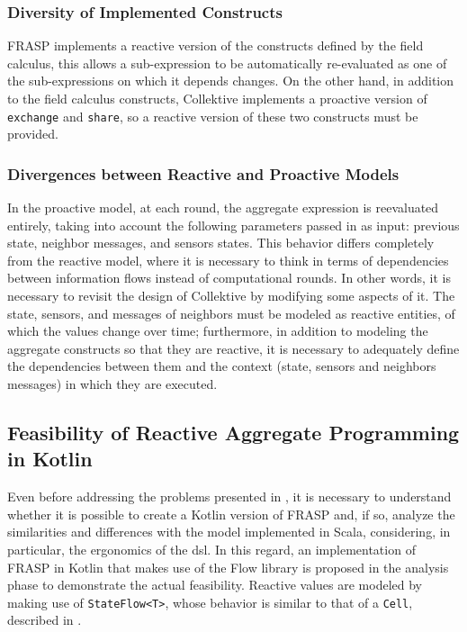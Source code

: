 \subsubsection{Diversity of Implemented Constructs}

FRASP implements a reactive version of the constructs defined by the field calculus, this allows a sub-expression to be automatically re-evaluated as one of the sub-expressions on which it depends changes. On the other hand, in addition to the field calculus constructs, Collektive implements a proactive version of \texttt{exchange} and \texttt{share}, so a reactive version of these two constructs must be provided.

\subsubsection{Divergences between Reactive and Proactive Models}

In the proactive model, at each round, the aggregate expression is reevaluated entirely, taking into account the following parameters passed in as input: previous state, neighbor messages, and sensors states. This behavior differs completely from the reactive model, where it is necessary to think in terms of dependencies between information flows instead of computational rounds. In other words, it is necessary to revisit the design of Collektive by modifying some aspects of it. The state, sensors, and messages of neighbors must be modeled as reactive entities, of which the values change over time; furthermore, in addition to modeling the aggregate constructs so that they are reactive, it is necessary to adequately define the dependencies between them and the context (state, sensors and neighbors messages) in which they are executed.

\subsection{Feasibility of Reactive Aggregate Programming in Kotlin}

Even before addressing the problems presented in , it is necessary to understand whether it is possible to create a Kotlin version of FRASP and, if so, analyze the similarities and differences with the model implemented in Scala, considering, in particular, the ergonomics of the \ac{dsl}. In this regard, an implementation of FRASP in Kotlin that makes use of the Flow library is proposed in the analysis phase to demonstrate the actual feasibility. Reactive values are modeled by making use of \texttt{StateFlow<T>}, whose behavior is similar to that of a \texttt{Cell}, described in .

